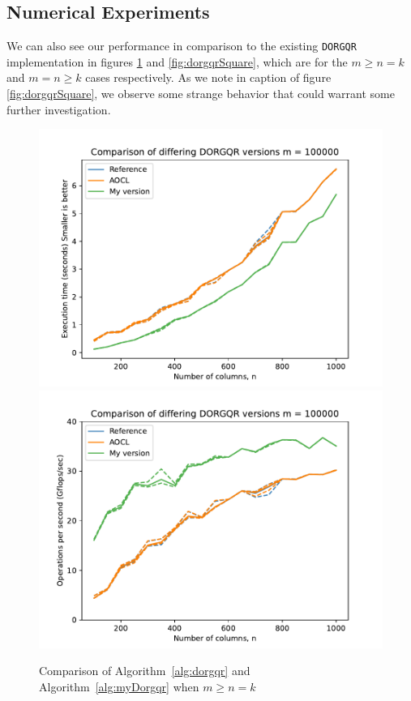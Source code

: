 \documentclass[12pt]{article}
\begin{document}
    \subsection{Numerical Experiments}
    We can also see our performance in comparison to the existing \verb|DORGQR| implementation in figures 
    \ref{fig:dorgqr} and \ref{fig:dorgqrSquare}, which are for the $m\geq n=k$ and $m=n\geq k$ cases respectively.
    As we note in caption of figure \ref{fig:dorgqrSquare}, we observe some strange behavior that could warrant
    some further investigation.
    \begin{figure}
        \centering
            \includegraphics[width=.45\textwidth]{figures/timeDORGQR.pdf}
            \includegraphics[width=.45\textwidth]{figures/flopDORGQR.pdf}
        \caption{Comparison of Algorithm~\ref{alg:dorgqr} and Algorithm~\ref{alg:myDorgqr} when $m\geq n=k$}\label{fig:dorgqr}
    \end{figure}
\end{document}
